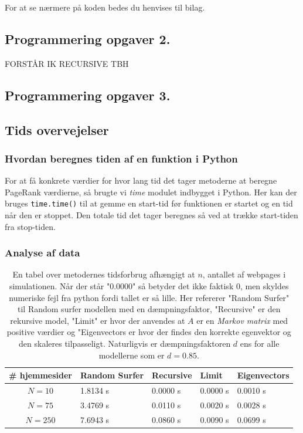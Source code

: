 For at se nærmere på koden bedes du henvises til bilag.

\subsection*{Programmering opgaver 2.}

FORSTÅR IK RECURSIVE TBH

\subsection*{Programmering opgaver 3.}


\subsection*{Tids overvejelser}
\subsubsection*{Hvordan beregnes tiden af en funktion i Python}
For at få konkrete værdier for hvor lang tid det tager metoderne at beregne PageRank værdierne, så brugte vi \emph{time} modulet indbygget i Python. Her kan der bruges \texttt{time.time()} til at gemme en start-tid før funktionen er startet og en tid når den er stoppet. Den totale tid det tager beregnes så ved at trække start-tiden fra stop-tiden.

\subsubsection*{Analyse af data}
\begin{table}[!h]
    \centering
    \begin{tabular}{c|l|l|l|l}
        \# hjemmesider & Random Surfer & Recursive & Limit & Eigenvectors \\
        \hline
        $N = 10$       & 1.8134 s   & 0.0000 s   & 0.0000 s   & 0.0010 s   \\
        $N = 75$       & 3.4769 s   & 0.0110 s   & 0.0020 s   & 0.0028 s   \\
        $N = 250$      & 7.6943 s   & 0.0860 s   & 0.0090 s   & 0.0699 s
    \end{tabular}
    \caption{En tabel over metodernes tidsforbrug afhængigt at $n$, antallet af webpages i simulationen. Når der står "0.0000" så betyder det ikke faktisk 0, men skyldes numeriske fejl fra python fordi tallet er så lille. Her refererer "Random Surfer" til Random surfer modellen med en dæmpningsfaktor, "Recursive" er den rekursive model, "Limit" er hvor der anvendes at $A$ er en \textit{Markov matrix} med positive værdier og "Eigenvectors er hvor der findes den korrekte egenvektor og den skaleres tilpasseligt. Naturligvis er dæmpningsfaktoren $d$ ens for alle modellerne som er $d = 0.85$.}
    \label{tidsFigur}
\end{table}

